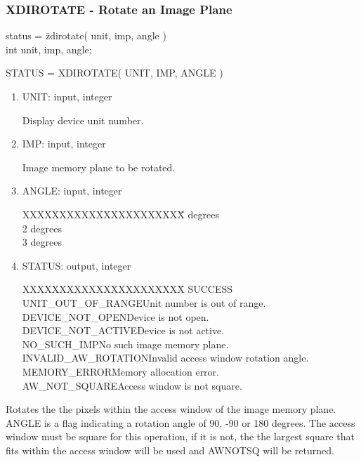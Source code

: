 \subsubsection{XDIROTATE - Rotate an Image Plane}
\begin{tabbing}
status = \=zdirotate( unit, imp, angle )\\
\>int  unit, imp, angle;\\
\end{tabbing}
STATUS = XDIROTATE( UNIT, IMP, ANGLE )
\begin{enumerate}
\item UNIT:  input, integer

Display device unit number.
\item IMP:  input, integer

Image memory plane to be rotated.
\item ANGLE:  input, integer
\begin{tabbing}
XXXXXXXXXXXXXXXXXXXXXX\= degrees\\
2 degrees\\
3 degrees\\
\end{tabbing}
\item STATUS:  output, integer
\begin{tabbing}
XXXXXXXXXXXXXXXXXXXXXX\=\kill
SUCCESS\\
UNIT\_OUT\_OF\_RANGE\>Unit number is out of range.\\
DEVICE\_NOT\_OPEN\>Device is not open.\\
DEVICE\_NOT\_ACTIVE\>Device is not active.\\
NO\_SUCH\_IMP\>No such image memory plane.\\
INVALID\_AW\_ROTATION\>Invalid access window rotation angle.\\
MEMORY\_ERROR\>Memory allocation error.\\
AW\_NOT\_SQUARE\>Access window is not square.\\
\end{tabbing}
\end{enumerate}
Rotates the the pixels within the access window of the image memory
plane.  ANGLE is a flag indicating a rotation angle of 90, -90 or 180
degrees.  The access window must be square for this operation, if it
is not, the the largest square that fits within the access window will
be used and AWNOTSQ will be returned.
\newpage
